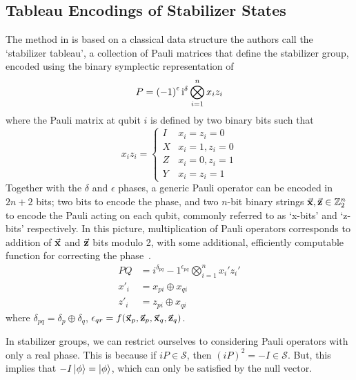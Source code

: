 \subsection{Tableau Encodings of Stabilizer States}\label{sec:sympencoding}
The method in \cite{Aaronson2004} is based on a classical data structure the authors call the `stabilizer tableau', a collection of Pauli matrices that define the stabilizer group, encoded using the binary symplectic representation of \cite{Dehaene2003}
\begin{equation} P = \left(-1\right)^{\epsilon} \mathrm{i}^{\delta}\bigotimes_{i=1}^{n} x_{i}z_{i}\end{equation}
where the Pauli matrix at qubit $i$ is defined by two binary bits such that
\begin{equation}
    x_{i}z_{i} = \begin{cases}
    I & x_{i}=z_{i}=0\\
    X & x_{i}=1, z_{i}=0 \\ 
    Z  &x_{i}=0, z_{i}=1 \\
    Y  &x_{i}=z_{i}=1
    \end{cases}
\end{equation}
Together with the $\delta$ and $\epsilon$ phases, a generic Pauli operator can be encoded in $2n+2$ bits; two bits to encode the phase, and two $n$-bit binary strings $\va{x},\va{z}\in\mathbb{Z}_{2}^{n}$ to encode the Pauli acting on each qubit, commonly referred to as `x-bits' and `z-bits' respectively. In this picture, multiplication of Pauli operators corresponds to addition of $\va{x}$ and $\va{z}$ bits modulo 2, with some additional, efficiently computable function for correcting the phase~\cite{Dehaene2003}.
\begin{align}
    P Q &= i^{\delta_{pq}}-1^{\epsilon_{pq}}\bigotimes_{i=1}^{n}x_{i}' z_{i}' \\
    x'_{i} &= x_{pi}\oplus x_{qi} \\
    z'_{i} &= z_{pi} \oplus x_{qi}
\end{align}
where $\delta_{pq} = \delta_{p}\oplus \delta_{q}$, $\epsilon_{qr} = f(\va{x}_{p}, \va{z}_{p}, \va{x}_{q}, \va{z}_{q})$.\par
In stabilizer groups, we can restrict ourselves to considering Pauli operators with only a real phase. This is because if $iP\in\mathcal{S}$, then $(iP)^{2}=-I\in\mathcal{S}$. But, this implies that $-I\ket{\phi}=\ket{\phi}$, which can only be satisfied by the null vector.\par
